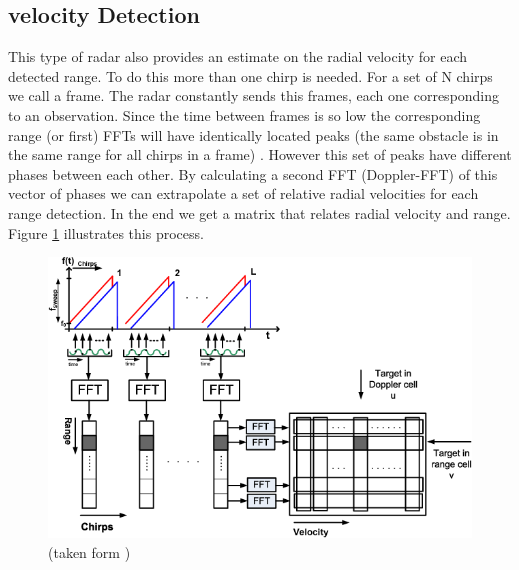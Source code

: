 \subsection*{velocity Detection}
This type of radar also provides an estimate on the radial velocity for each detected range. To do this more than one chirp is needed. For a set of N chirps we call a frame. The radar constantly sends this frames, each one corresponding to an observation. Since the time between frames is so low the corresponding range (or first) \ac{FFT}s will have  identically located peaks (the same obstacle is in the same range for all chirps in a frame) . However this set of peaks have different phases between each other. By calculating a second \ac{FFT} (Doppler-FFT) of this vector of phases we can extrapolate a set of relative radial velocities  for each range detection. In the end we get a matrix that relates radial velocity and range. 
Figure \ref{fig:matrix} illustrates this process.
\begin{figure}[h] 
\centerline{\includegraphics [width=0.8 \textwidth]{imgs/chapter2/dopplerFFT2.png}}
\caption{(taken form \cite{schroeder2010x})}
\label{fig:matrix}
\end{figure}
